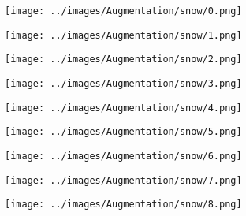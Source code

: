 \begin{figure}[H]
  \centering
 \captionsetup[subfigure]{labelformat=empty}
  \begin{subfigure}[b]{0.1\textwidth}
      \centering
      \texttt{[image: ../images/Augmentation/snow/0.png]}
  \end{subfigure}
  \hspace{1em}%
  \begin{subfigure}[b]{0.1\textwidth}
      \centering
      \texttt{[image: ../images/Augmentation/snow/1.png]}
  \end{subfigure}
  \hspace{1em}%
  \begin{subfigure}[b]{0.1\textwidth}
      \centering
      \texttt{[image: ../images/Augmentation/snow/2.png]}
  \end{subfigure}
  \hspace{1em}%
  \begin{subfigure}[b]{0.1\textwidth}
   \centering
   \texttt{[image: ../images/Augmentation/snow/3.png]}
 \end{subfigure}
 \hspace{1em}%
 \begin{subfigure}[b]{0.1\textwidth}
   \centering
   \texttt{[image: ../images/Augmentation/snow/4.png]}
 \end{subfigure}
 \hspace{1em}%
 \begin{subfigure}[b]{0.1\textwidth}
   \centering
   \texttt{[image: ../images/Augmentation/snow/5.png]}
 \end{subfigure}
 \hspace{1em}%
 \begin{subfigure}[b]{0.1\textwidth}
   \centering
   \texttt{[image: ../images/Augmentation/snow/6.png]}
 \end{subfigure}
 \hspace{1em}%
 \begin{subfigure}[b]{0.1\textwidth}
  \centering
  \texttt{[image: ../images/Augmentation/snow/7.png]}
\end{subfigure}
\hspace{1em}%
 \begin{subfigure}[b]{0.1\textwidth}
 \centering
 \texttt{[image: ../images/Augmentation/snow/8.png]}
 \end{subfigure}
 \hspace{1em}%

\end{figure}
